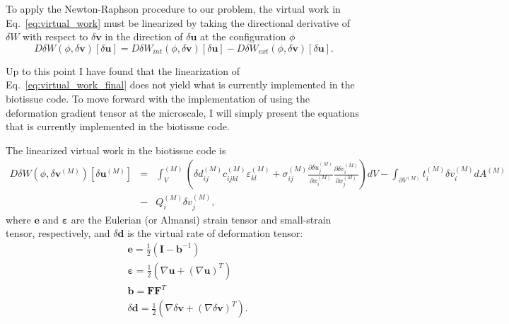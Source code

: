 To apply the Newton-Raphson procedure to our problem, the virtual work in Eq.\ \eqref{eq:virtual_work} must be linearized by taking the directional derivative of $\delta W$ with respect to $\delta \pmb{v}$ in the direction of $\delta \pmb{u}$ at the configuration $\phi$
%
\begin{equation}
D\delta W (\phi,\delta \pmb{v}) [\delta \pmb{u}] = D\delta W_{int} (\phi,\delta \pmb{v}) [\delta \pmb{u}] - D\delta W_{ext} (\phi,\delta \pmb{v}) [\delta \pmb{u}].
\end{equation}
%
%

Up to this point I have found that the linearization of Eq.\ \eqref{eq:virtual_work_final} does not yield what is currently implemented in the biotissue code. To move forward with the implementation of using the deformation gradient tensor at the microscale, I will simply present the equations that is currently implemented in the biotissue code.

The linearized virtual work in the biotissue code is
%
\begin{eqnarray}
D\delta W(\phi,\delta \pmb{v}^{(M)})[\delta \pmb{u}^{(M)}]  
%
&=& \int_V^{(M)} \left(\delta d_{ij}^{(M)} c_{ijkl}^{(M)} \varepsilon_{kl}^{(M)} +  \sigma_{ij}^{(M)} \frac{\partial \delta u_j^{(M)}}{\partial x_i^{(M)}}\frac{\partial \delta v_i^{(M)}}{\partial x_j^{(M)}}\right) d V - \int_{\partial V^{(M)}} t_i^{(M)} \delta v_i^{(M)} dA^{(M)} \nonumber\\
&-& Q_i^{(M)} \delta v_j^{(M)},
\label{eq:virtual_work_linearized}
\end{eqnarray}
%
where $\pmb{e}$ and $\pmb{\varepsilon}$ are the Eulerian (or Almansi) strain tensor and small-strain tensor, respectively, and $\delta \pmb{d}$ is the virtual rate of deformation tensor:
%
\begin{align}
&\pmb{e} = \frac{1}{2}(\pmb{I} - \pmb{b}^{-1}) \nonumber\\
%
&\pmb{\varepsilon} = \frac{1}{2}\left(\nabla \pmb{u} + (\nabla \pmb{u})^T\right) \nonumber\\
%
&\pmb{b} = \pmb{F}\pmb{F}^T \\
%
&\delta \pmb{d} = \frac{1}{2}\left(\nabla \delta \pmb{v}  + (\nabla \delta \pmb{v})^T\right).
\end{align}
%

